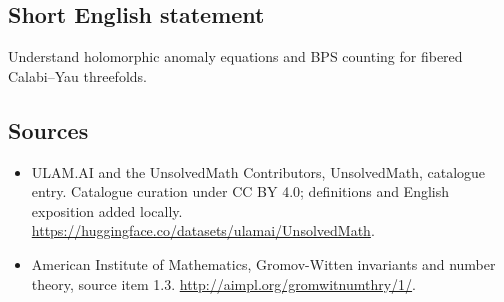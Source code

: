\documentclass[11pt]{article}
\begin{document}
\subsection{Short English statement}
Understand holomorphic anomaly equations and BPS counting for fibered Calabi–Yau threefolds.
\subsection{Sources}
\begin{itemize}
\item[\hypertarget{source:statement:1}{S1}] ULAM.AI and the UnsolvedMath Contributors, UnsolvedMath, catalogue entry. Catalogue curation under CC BY 4.0; definitions and English exposition added locally.
\url{https://huggingface.co/datasets/ulamai/UnsolvedMath}.
\item[\hypertarget{source:statement:2}{S2}] American Institute of Mathematics, Gromov-Witten invariants and number theory, source item 1.3.
\url{http://aimpl.org/gromwitnumthry/1/}.
\end{itemize}
\label{end:statement}
\end{document}
